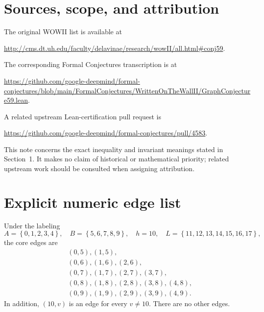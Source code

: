 \documentclass[11pt]{article}
\newcommand{\set}[1]{\left\{#1\right\}}
\begin{document}
\section{Sources, scope, and attribution}

The original WOWII list is available at
\begin{center}
\url{http://cms.dt.uh.edu/faculty/delavinae/research/wowII/all.html#conj59}.
\end{center}
The corresponding Formal Conjectures transcription is at
\begin{center}
\url{https://github.com/google-deepmind/formal-conjectures/blob/main/FormalConjectures/WrittenOnTheWallII/GraphConjecture59.lean}.
\end{center}
A related upstream Lean-certification pull request is
\begin{center}
\url{https://github.com/google-deepmind/formal-conjectures/pull/4583}.
\end{center}
This note concerns the exact inequality and invariant meanings stated in
Section~1. It makes no claim of historical or mathematical priority; related
upstream work should be consulted when assigning attribution.

\clearpage
\appendix
\section{Explicit numeric edge list}
\thispagestyle{fancy}

Under the labeling
\[
 A=\set{0,1,2,3,4},\quad B=\set{5,6,7,8,9},\quad h=10,
 \quad L=\set{11,12,13,14,15,16,17},
\]
the core edges are
\begin{align*}
 &(0,5),(1,5),\\
 &(0,6),(1,6),(2,6),\\
 &(0,7),(1,7),(2,7),(3,7),\\
 &(0,8),(1,8),(2,8),(3,8),(4,8),\\
 &(0,9),(1,9),(2,9),(3,9),(4,9).
\end{align*}
In addition, $(10,v)$ is an edge for every $v\ne10$. There are no other
edges.
\end{document}
